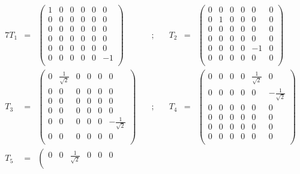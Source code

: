 \documentclass[10pt,a4paper]{article}
\begin{document}
\begin{table}[htb]
  \centering
  \begin{alignat*}{7}
   T_1 & =  & \left(
\begin{array}{cccccc}
 1 & 0 & 0 & 0 & 0 & 0 \\
 0 & 0 & 0 & 0 & 0 & 0 \\
 0 & 0 & 0 & 0 & 0 & 0 \\
 0 & 0 & 0 & 0 & 0 & 0 \\
 0 & 0 & 0 & 0 & 0 & 0 \\
 0 & 0 & 0 & 0 & 0 & -1 \\
\end{array}
\right) &\quad ;  \quad & T_2& =  & \left(
\begin{array}{cccccc}
 0 & 0 & 0 & 0 & 0 & 0 \\
 0 & 1 & 0 & 0 & 0 & 0 \\
 0 & 0 & 0 & 0 & 0 & 0 \\
 0 & 0 & 0 & 0 & 0 & 0 \\
 0 & 0 & 0 & 0 & -1 & 0 \\
 0 & 0 & 0 & 0 & 0 & 0 \\
\end{array}
\right) \nonumber\\
   T_3 & =  & \left(
\begin{array}{cccccc}
 0 & \frac{1}{\sqrt{2}} & 0 & 0 & 0 & 0 \\
 0 & 0 & 0 & 0 & 0 & 0 \\
 0 & 0 & 0 & 0 & 0 & 0 \\
 0 & 0 & 0 & 0 & 0 & 0 \\
 0 & 0 & 0 & 0 & 0 & -\frac{1}{\sqrt{2}} \\
 0 & 0 & 0 & 0 & 0 & 0 \\
\end{array}
\right) &\quad ;  \quad   & T_4& =  & \left(
\begin{array}{cccccc}
 0 & 0 & 0 & 0 & \frac{1}{\sqrt{2}} & 0 \\
 0 & 0 & 0 & 0 & 0 & -\frac{1}{\sqrt{2}} \\
 0 & 0 & 0 & 0 & 0 & 0 \\
 0 & 0 & 0 & 0 & 0 & 0 \\
 0 & 0 & 0 & 0 & 0 & 0 \\
 0 & 0 & 0 & 0 & 0 & 0 \\
\end{array}
\right) \nonumber\\
  T_5 & =  & \left(
\begin{array}{cccccc}
 0 & 0 & \frac{1}{\sqrt{2}} & 0 & 0 & 0 \\

\end{array}
\end{alignat*}
\end{table}
\end{document}
